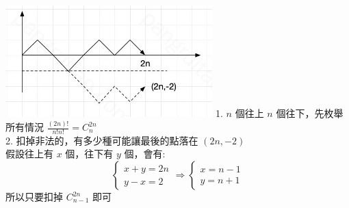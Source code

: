 \includegraphics[width=8cm]{6_Math/Catalan.png}
1. $n$ 個往上 $n$ 個往下，先枚舉所有情況 $\frac{(2n)!}{n!n!} = C_{n}^{2n}$\\
2. 扣掉非法的，有多少種可能讓最後的點落在 $(2n, -2)$\\
假設往上有 $x$ 個，往下有 $y$ 個，會有:
$$
\begin{cases}
x + y = 2n\\
y - x = 2
\end{cases}
\Rightarrow
\begin{cases}
x = n - 1\\
y = n + 1
\end{cases}
$$
所以只要扣掉 $C_{n-1}^{2n}$ 即可